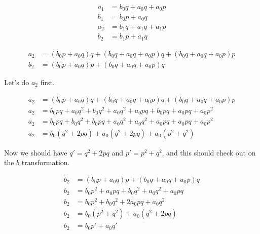 \documentclass{article}
\begin{document}
\[
	\begin{aligned}
		a_1 &= b_0q + a_0q + a_0p \\
		b_1 &= b_0p + a_0q \\
		a_2 &= b_1q + a_1q + a_1p \\
		b_2 &= b_1p + a_1q
	\end{aligned}
\]

\[
	\begin{aligned}
		a_2 &= (b_0p + a_0q)q + (b_0q + a_0q + a_0p)q + (b_0q + a_0q + a_0p)p \\
		b_2 &= (b_0p + a_0q)p + (b_0q + a_0q + a_0p)q
	\end{aligned}
\]

Let's do $a_2$ first.

\[
	\begin{aligned}
		a_2 &= (b_0p + a_0q)q + (b_0q + a_0q + a_0p)q + (b_0q + a_0q + a_0p)p \\
		a_2 &= b_0pq + a_0q^2 + b_0q^2 + a_0q^2 + a_0pq + b_0pq + a_0pq + a_0p^2 \\
		a_2 &= b_0pq +  b_0q^2 + b_0pq +  a_0q^2  + a_0q^2 + a_0pq +  a_0pq + a_0p^2 \\
		a_2 &= b_0(q^2 + 2pq) + a_0(q^2 + 2pq)  + a_0(p^2 + q^2)
	\end{aligned}
\]

Now we should have $q' = q^2 + 2pq$ and $p' = p^2 + q^2$, and this should check
out on the $b$ transformation.

\[
	\begin{aligned}
		b_2 &= (b_0p + a_0q)p + (b_0q + a_0q + a_0p)q \\
		b_2 &= b_0p^2 + a_0pq + b_0q^2 + a_0q^2 + a_0pq \\
		b_2 &= b_0p^2 + b_0q^2 + 2a_0pq + a_0q^2  \\
		b_2 &= b_0(p^2 + q^2) + a_0(q^2 + 2pq) \\
		b_2 &= b_0p' + a_0q' \\
	\end{aligned}
\]
\end{document}

